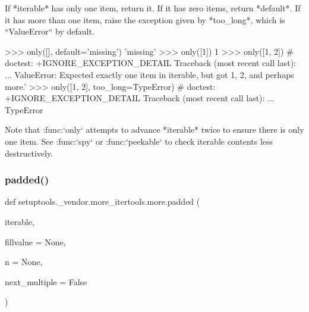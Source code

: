 \begin{DoxyVerb}If *iterable* has only one item, return it.
If it has zero items, return *default*.
If it has more than one item, raise the exception given by *too_long*,
which is ``ValueError`` by default.

>>> only([], default='missing')
'missing'
>>> only([1])
1
>>> only([1, 2])  # doctest: +IGNORE_EXCEPTION_DETAIL
Traceback (most recent call last):
...
ValueError: Expected exactly one item in iterable, but got 1, 2,
 and perhaps more.'
>>> only([1, 2], too_long=TypeError)  # doctest: +IGNORE_EXCEPTION_DETAIL
Traceback (most recent call last):
...
TypeError

Note that :func:`only` attempts to advance *iterable* twice to ensure there
is only one item.  See :func:`spy` or :func:`peekable` to check
iterable contents less destructively.
\end{DoxyVerb}
 \mbox{\label{namespacesetuptools_1_1__vendor_1_1more__itertools_1_1more_a47d774718336d9c7ce26b793293948ad}} 
\subsubsection{\texorpdfstring{padded()}{padded()}}
{\footnotesize\ttfamily def setuptools.\+\_\+vendor.\+more\+\_\+itertools.\+more.\+padded (\begin{DoxyParamCaption}\item[{}]{iterable,  }\item[{}]{fillvalue = {\ttfamily None},  }\item[{}]{n = {\ttfamily None},  }\item[{}]{next\+\_\+multiple = {\ttfamily False} }\end{DoxyParamCaption})}

